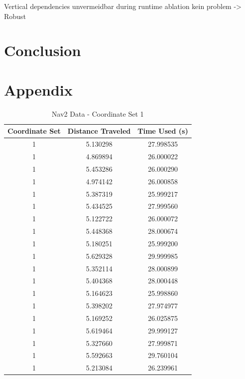 \documentclass[%
paper=A4,               %
twoside=true,           %
openright,              %
11pt,                   %
bibliography=totoc,     %
titlepage=on,           %
DIV=12,                 %
BCOR=1.5cm,             %
parskip=half,            %
final
]{scrreprt}
\begin{document}
	Vertical dependencies unvermeidbar 
	during runtime ablation kein problem -> Robust
	\chapter{Conclusion}
	
	
		\chapter{Appendix}
	\begin{table}[h!]
		\centering
		\begin{tabular}{|c|c|c|}
			\hline
			Coordinate Set & Distance Traveled & Time Used (s) \\
			\hline
			1 & 5.130298 & 27.998535 \\
			1 & 4.869894 & 26.000022 \\
			1 & 5.453286 & 26.000290 \\
			1 & 4.974142 & 26.000858 \\
			1 & 5.387319 & 25.999217 \\
			1 & 5.434525 & 27.999560 \\
			1 & 5.122722 & 26.000072 \\
			1 & 5.448368 & 28.000674 \\
			1 & 5.180251 & 25.999200 \\
			1 & 5.629328 & 29.999985 \\
			1 & 5.352114 & 28.000899 \\
			1 & 5.404368 & 28.000448 \\
			1 & 5.164623 & 25.998860 \\
			1 & 5.398202 & 27.974977 \\
			1 & 5.169252 & 26.025875 \\
			1 & 5.619464 & 29.999127 \\
			1 & 5.327660 & 27.999871 \\
			1 & 5.592663 & 29.760104 \\
			1 & 5.213084 & 26.239961 \\
			\hline
		\end{tabular}
		\caption{Nav2 Data - Coordinate Set 1}
		\label{tab:2}
	\end{table}
	
\end{document}
